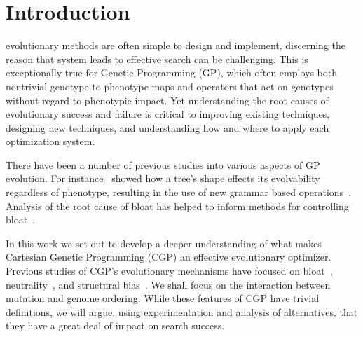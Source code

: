 \documentclass[journal]{IEEEtran}
\begin{document}
%
\IEEEpeerreviewmaketitle



\section{Introduction}
% 
% 
% 
% 
 evolutionary methods are often simple to design
and implement, discerning the reason that system
leads to effective search can be challenging.
This is exceptionally
true for Genetic Programming (GP), which often employs both nontrivial
genotype to phenotype maps and operators that act on genotypes without regard to
phenotypic impact.  Yet understanding the root causes of evolutionary success
and failure is critical to improving existing techniques, designing new techniques,
and understanding how and where to apply each optimization system.

There have been a number of previous studies into various aspects of GP evolution.
For instance~\cite{daida3:2003:treebias} showed how a tree's shape effects its evolvability
regardless of phenotype,
resulting in the use of new grammar based operations~\cite{xuan:2006:grammar}.
Analysis of the root cause of bloat has helped to inform methods for controlling
bloat~\cite{luke:2006:bloat}.

In this work we set out to develop a deeper understanding of what makes Cartesian
Genetic Programming (CGP) an effective evolutionary optimizer.
Previous studies of CGP's evolutionary mechanisms have
focused on bloat~\cite{miller:2001:bloat},
neutrality~\cite{vassilev:2000:neutrality}, and structural bias~\cite{payne:2009:bias}.
We shall focus on the interaction between mutation and genome ordering.
While these features of CGP have trivial definitions, we will argue, using
experimentation and analysis of alternatives, that they have a great deal
of impact on search success.
\end{document}
